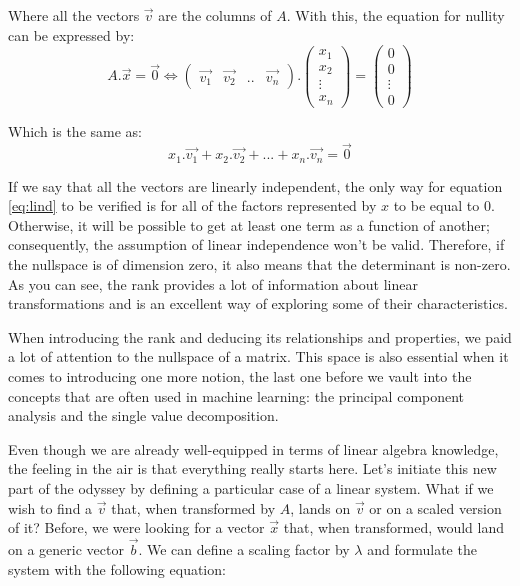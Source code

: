\documentclass[a4,12pt,twosided,openany]{memoir}
\begin{document}
\par 
\indent
Where all the vectors $\overrightarrow{v}$ are the columns of $A$. With this, the equation for nullity can be expressed by:
\[
A.\overrightarrow{x} = \overrightarrow{0} \Leftrightarrow \begin{pmatrix}
\overrightarrow{v_1} & \overrightarrow{v_2} & .. & \overrightarrow{v_n}
\end{pmatrix}
.\begin{pmatrix}
x_1\\
x_2\\
\vdots\\
x_n
\end{pmatrix} = \begin{pmatrix}
0\\
0\\
\vdots\\
0
\end{pmatrix}
\]
\par 
\indent
Which is the same as:
\begin{equation}\label{eq:lind}
x_1.\overrightarrow{v_1} + x_2.\overrightarrow{v_2} + ... + x_n.\overrightarrow{v_n} = \overrightarrow{0} 
\end{equation}
\par 
\indent
If we say that all the vectors are linearly independent, the only way for equation \ref{eq:lind} to be verified is for all of the factors represented by $x$ to be equal to 0. Otherwise, it will be possible to get at least one term as a function of another; consequently, the assumption of linear independence won’t be valid. Therefore, if the nullspace is of dimension zero, it also means that the determinant is non-zero. As you can see, the rank provides a lot of information about linear transformations and is an excellent way of exploring some of their characteristics. 
\par 
\indent
When introducing the rank and deducing its relationships and properties, we paid a lot of attention to the nullspace of a matrix. This space is also essential when it comes to introducing one more notion, the last one before we vault into the concepts that are often used in machine learning: the principal component analysis and the single value decomposition. 
\par 
\indent
Even though we are already well-equipped in terms of linear algebra knowledge, the feeling in the air is that everything really starts here. Let’s initiate this new part of the odyssey by defining a particular case of a linear system. What if we wish to find a $\overrightarrow{v}$ that, when transformed by $A$, lands on $\overrightarrow{v}$ or on a scaled version of it? Before, we were looking for a vector $\overrightarrow{x}$ that, when transformed, would land on a generic vector $\overrightarrow{b}$. We can define a scaling factor by $\lambda$ and formulate the system with the following equation:
\end{document}
